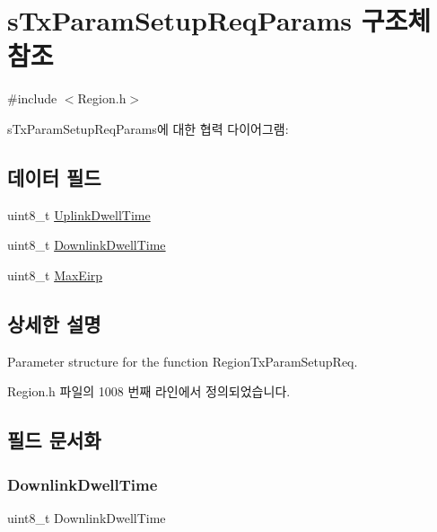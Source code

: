 \hypertarget{structs_tx_param_setup_req_params}{}\section{s\+Tx\+Param\+Setup\+Req\+Params 구조체 참조}
\label{structs_tx_param_setup_req_params}


{\ttfamily \#include $<$Region.\+h$>$}



s\+Tx\+Param\+Setup\+Req\+Params에 대한 협력 다이어그램\+:
\subsection*{데이터 필드}
\begin{DoxyCompactItemize}
\item 
uint8\+\_\+t \mbox{\hyperlink{structs_tx_param_setup_req_params_a0e6663762d6f9173bc8d8cb018f8f17a}{Uplink\+Dwell\+Time}}
\item 
uint8\+\_\+t \mbox{\hyperlink{structs_tx_param_setup_req_params_a63074ce7d23ff98956f5d6f4054f235f}{Downlink\+Dwell\+Time}}
\item 
uint8\+\_\+t \mbox{\hyperlink{structs_tx_param_setup_req_params_a6ac3be51bb6670f1617b54ec4781ca0f}{Max\+Eirp}}
\end{DoxyCompactItemize}


\subsection{상세한 설명}
Parameter structure for the function Region\+Tx\+Param\+Setup\+Req. 

Region.\+h 파일의 1008 번째 라인에서 정의되었습니다.



\subsection{필드 문서화}
\mbox{\label{structs_tx_param_setup_req_params_a63074ce7d23ff98956f5d6f4054f235f}} 
\subsubsection{\texorpdfstring{Downlink\+Dwell\+Time}{DownlinkDwellTime}}
{\footnotesize\ttfamily uint8\+\_\+t Downlink\+Dwell\+Time}

